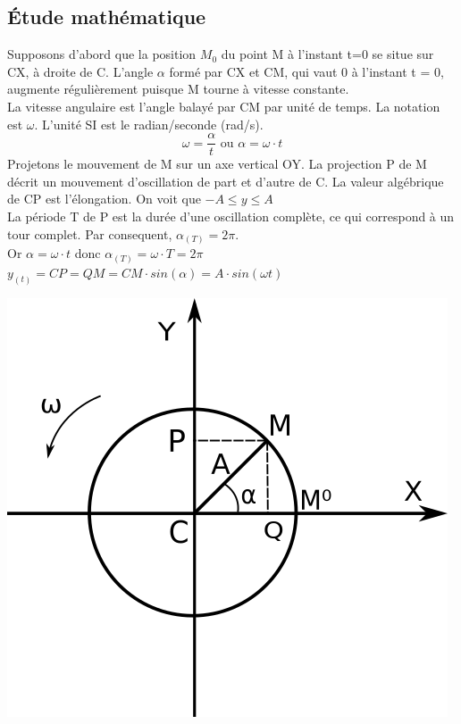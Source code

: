 \documentclass[11pt]{article}
\begin{document}
\subsection{Étude mathématique}
Supposons d'abord que la position $M_{0}$ du point M à l'instant t=0 se situe sur CX, à droite de C. L'angle $\alpha$ formé par CX et CM, qui vaut 0 à l'instant t = 0, augmente régulièrement puisque M tourne à vitesse constante.\\
La vitesse angulaire est l'angle balayé par CM par unité de temps. La notation est $\omega$. L'unité SI est le radian/seconde (rad/s).\\
$$\omega = \dfrac{\alpha}{t} \text{ ou } \alpha=\omega \cdot t$$
Projetons le mouvement de M sur un axe vertical OY. La projection P de M décrit un mouvement d'oscillation de part et d'autre de C. La valeur algébrique de CP est l'élongation. On voit que $-A \leqslant y \leqslant A $\\
La période T de P est la durée d'une oscillation complète, ce qui correspond à un tour complet. Par consequent, $\alpha _{(T)}=2\pi$.\\
Or $\alpha=\omega \cdot t$ donc $\alpha _{(T)}=\omega \cdot T = 2\pi$\\
$y_{(t)} = CP = QM = CM \cdot sin(\alpha) = A \cdot sin(\omega t)$
\begin{center}
    \includegraphics[scale=0.5]{Fig1_8.png}
\end{center}
\end{document}
